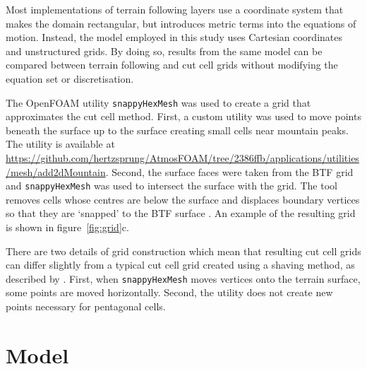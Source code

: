 \documentclass[twocol]{ametsoc}
\begin{document}
Most implementations of terrain following layers use a coordinate system that makes the domain rectangular, but introduces metric terms into the equations of motion.  Instead, the model employed in this study uses Cartesian coordinates and unstructured grids.  By doing so, results from the same model can be compared between terrain following and cut cell grids without modifying the equation set or discretisation.

The OpenFOAM utility \texttt{snappyHexMesh} was used to create a grid that approximates the cut cell method.  First, a custom utility was used to move points beneath the surface up to the surface creating small cells near mountain peaks.  The utility is available at \url{https://github.com/hertzsprung/AtmosFOAM/tree/2386ffb/applications/utilities/mesh/add2dMountain}.  Second, the surface faces were taken from the BTF grid and \texttt{snappyHexMesh} was used to intersect the surface with the grid.  The tool removes cells whose centres are below the surface and displaces boundary vertices so that they are `snapped' to the BTF surface \citep{openfoam2015}.  An example of the resulting grid is shown in figure~\ref{fig:grid}c.

There are two details of grid construction which mean that resulting cut cell grids can differ slightly from a typical cut cell grid created using a shaving method, as described by \citet{adcroft1997}.  First, when \texttt{snappyHexMesh} moves vertices onto the terrain surface, some points are moved horizontally.  Second, the utility does not create new points necessary for pentagonal cells.


\section{Model}
\label{sec:model}
\end{document}
